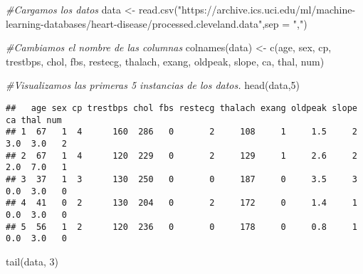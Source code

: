 \documentclass[
]{article}
\newenvironment{Shaded}{\begin{snugshade}}{\end{snugshade}}
\newcommand{\AttributeTok}[1]{\textcolor[rgb]{0.77,0.63,0.00}{#1}}
\newcommand{\CommentTok}[1]{\textcolor[rgb]{0.56,0.35,0.01}{\textit{#1}}}
\newcommand{\DecValTok}[1]{\textcolor[rgb]{0.00,0.00,0.81}{#1}}
\newcommand{\FunctionTok}[1]{\textcolor[rgb]{0.00,0.00,0.00}{#1}}
\newcommand{\NormalTok}[1]{#1}
\newcommand{\OtherTok}[1]{\textcolor[rgb]{0.56,0.35,0.01}{#1}}
\newcommand{\StringTok}[1]{\textcolor[rgb]{0.31,0.60,0.02}{#1}}
\begin{document}
\begin{Shaded}
\begin{Highlighting}[]
\CommentTok{\#Cargamos los datos}
\NormalTok{data }\OtherTok{\textless{}{-}} \FunctionTok{read.csv}\NormalTok{(}\StringTok{"https://archive.ics.uci.edu/ml/machine{-}learning{-}databases/heart{-}disease/processed.cleveland.data"}\NormalTok{,}\AttributeTok{sep =} \StringTok{","}\NormalTok{)}

\CommentTok{\#Cambiamos el nombre de las columnas }
\FunctionTok{colnames}\NormalTok{(data) }\OtherTok{\textless{}{-}} \FunctionTok{c}\NormalTok{(}\StringTok{\textquotesingle{}age\textquotesingle{}}\NormalTok{, }\StringTok{\textquotesingle{}sex\textquotesingle{}}\NormalTok{, }\StringTok{\textquotesingle{}cp\textquotesingle{}}\NormalTok{, }\StringTok{\textquotesingle{}trestbps\textquotesingle{}}\NormalTok{, }\StringTok{\textquotesingle{}chol\textquotesingle{}}\NormalTok{, }\StringTok{\textquotesingle{}fbs\textquotesingle{}}\NormalTok{, }\StringTok{\textquotesingle{}restecg\textquotesingle{}}\NormalTok{, }\StringTok{\textquotesingle{}thalach\textquotesingle{}}\NormalTok{, }\StringTok{\textquotesingle{}exang\textquotesingle{}}\NormalTok{, }\StringTok{\textquotesingle{}oldpeak\textquotesingle{}}\NormalTok{, }\StringTok{\textquotesingle{}slope\textquotesingle{}}\NormalTok{, }\StringTok{\textquotesingle{}ca\textquotesingle{}}\NormalTok{, }\StringTok{\textquotesingle{}thal\textquotesingle{}}\NormalTok{, }\StringTok{\textquotesingle{}num\textquotesingle{}}\NormalTok{)}

\CommentTok{\#Visualizamos las primeras 5 instancias de los datos.}
\FunctionTok{head}\NormalTok{(data,}\DecValTok{5}\NormalTok{)}
\end{Highlighting}
\end{Shaded}

\begin{verbatim}
##   age sex cp trestbps chol fbs restecg thalach exang oldpeak slope  ca thal num
## 1  67   1  4      160  286   0       2     108     1     1.5     2 3.0  3.0   2
## 2  67   1  4      120  229   0       2     129     1     2.6     2 2.0  7.0   1
## 3  37   1  3      130  250   0       0     187     0     3.5     3 0.0  3.0   0
## 4  41   0  2      130  204   0       2     172     0     1.4     1 0.0  3.0   0
## 5  56   1  2      120  236   0       0     178     0     0.8     1 0.0  3.0   0
\end{verbatim}

\begin{Shaded}
\begin{Highlighting}[]
\FunctionTok{tail}\NormalTok{(data, }\DecValTok{3}\NormalTok{)}
\end{Highlighting}
\end{Shaded}
\end{document}
